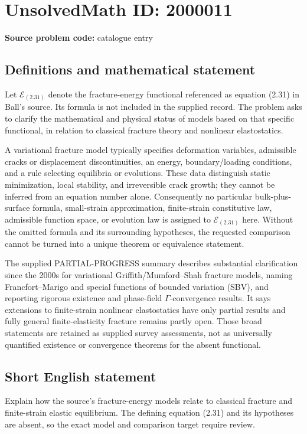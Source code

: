 \documentclass[11pt]{article}
\begin{document}
\section*{UnsolvedMath ID: 2000011}
\textbf{Source problem code:} catalogue entry
\subsection{Definitions and mathematical statement}
Let \(\mathcal E_{(2.31)}\) denote the fracture-energy functional referenced as equation (2.31) in Ball's source. Its formula is not included in the supplied record. The problem asks to clarify the mathematical and physical status of models based on that specific functional, in relation to classical fracture theory and nonlinear elastostatics.

A variational fracture model typically specifies deformation variables, admissible cracks or displacement discontinuities, an energy, boundary/loading conditions, and a rule selecting equilibria or evolutions. These data distinguish static minimization, local stability, and irreversible crack growth; they cannot be inferred from an equation number alone. Consequently no particular bulk-plus-surface formula, small-strain approximation, finite-strain constitutive law, admissible function space, or evolution law is assigned to \(\mathcal E_{(2.31)}\) here. Without the omitted formula and its surrounding hypotheses, the requested comparison cannot be turned into a unique theorem or equivalence statement.

The supplied PARTIAL-PROGRESS summary describes substantial clarification since the 2000s for variational Griffith/Mumford--Shah fracture models, naming Francfort--Marigo and special functions of bounded variation (SBV), and reporting rigorous existence and phase-field \(\Gamma\)-convergence results. It says extensions to finite-strain nonlinear elastostatics have only partial results and fully general finite-elasticity fracture remains partly open. Those broad statements are retained as supplied survey assessments, not as universally quantified existence or convergence theorems for the absent functional.
\subsection{Short English statement}
Explain how the source's fracture-energy models relate to classical fracture and finite-strain elastic equilibrium. The defining equation (2.31) and its hypotheses are absent, so the exact model and comparison target require review.
\end{document}

